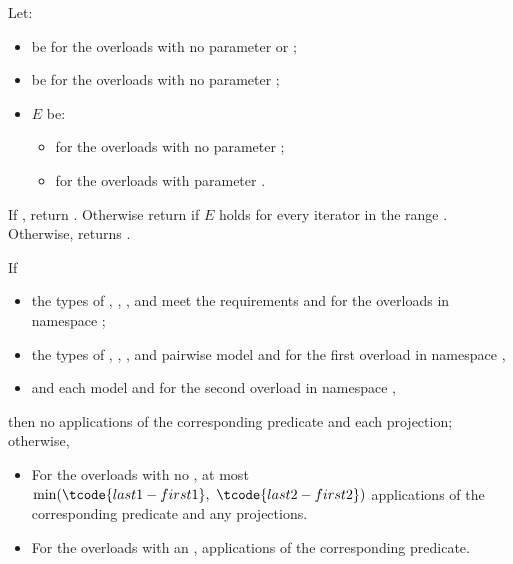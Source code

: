 \begin{itemdescr}
\pnum
Let:
\begin{itemize}
\item
   be 
  for the overloads with no parameter  or ;
\item
   be 
  for the overloads with no parameter ;
\item
  $E$ be:
  \begin{itemize}
  \setlength{\emergencystretch}{1em}
  \item
    for the overloads with no parameter ;
  \item
    for the overloads with parameter .
  \end{itemize}
\end{itemize}

\pnum
\returns
If , return .
Otherwise return 
if $E$ holds for every iterator  in the range .
Otherwise, returns .

\pnum
\complexity
If
\begin{itemize}
\item
  the types of , , , and 
  meet the
   requirements
  and 
  for the overloads in namespace ;
\item
 the types of , , , and 
 pairwise model 
  and 
  for the first overload in namespace ,
\item
    and  each model  and
   for the second overload in namespace ,
\end{itemize}
then no applications of the corresponding predicate and each projection;
otherwise,
\begin{itemize}
\item
  For the overloads with no ,
  at most $\min(\tcode{last1 - first1}, \ \tcode{last2 - first2})$
  applications of the corresponding predicate and any projections.
\item
  For the overloads with an ,
  applications of the corresponding predicate.
\end{itemize}
\end{itemdescr}

